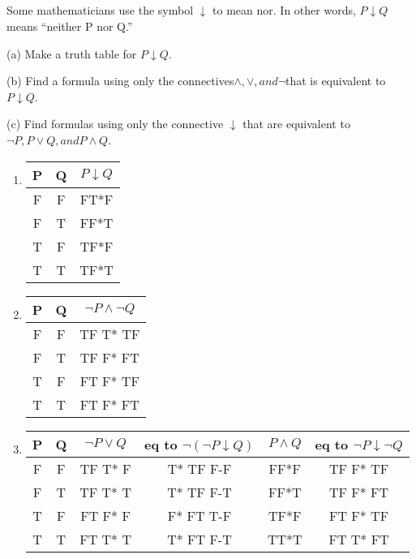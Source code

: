 \documentclass{article}
\begin{document}
\subsection{}
Some mathematicians use the symbol $\downarrow$ to mean nor. In other words,
$P \downarrow Q$ means “neither P nor Q.”

(a) Make a truth table for $P \downarrow Q$.

(b) Find a formula using only the connectives$ \land, \lor, and \neg $that is
equivalent to $P \downarrow Q$.

(c) Find formulas using only the connective $\downarrow$ that are equivalent to $\neg P, P
\lor Q, and P \land Q$.

\begin{enumerate}[label=(\alph*)]
  \item 
\begin{center}
 \begin{tabular}{||c c c ||} 
 \hline
 P & Q & $P \downarrow Q$ \\ [0.5ex] 
 \hline\hline
 F & F & FT*F\\ 
 \hline
 F & T & FF*T\\
 \hline
 T & F & TF*F\\
 \hline
 T & T & TF*T\\ [1ex] 
 \hline
\end{tabular}
\end{center}
\item
\begin{center}
 \begin{tabular}{||c c c ||} 
 \hline
 P & Q & $\neg P \land \neg Q$ \\ [0.5ex] 
 \hline\hline
 F & F & TF T* TF\\ 
 \hline
 F & T & TF F* FT\\
 \hline
 T & F & FT F* TF\\
 \hline
 T & T & FT F* FT\\ [1ex] 
 \hline
\end{tabular}
\end{center}
\item 
\begin{center}
 \begin{tabular}{||c c c c c c||} 
 \hline
 P & Q & $\neg P \lor Q$ &eq to $\neg(\neg P\downarrow Q )$ & $P \land Q$ & eq to $\neg P \downarrow \neg Q$  \\ [0.5ex] 
 \hline\hline
 F & F & TF T* F & T* TF F-F & FF*F & TF F* TF\\ 
 \hline
 F & T & TF T* T & T* TF F-T & FF*T & TF F* FT\\
 \hline
 T & F & FT F* F & F* FT T-F & TF*F & FT F* TF\\
 \hline
 T & T & FT T* T & T* FT F-T & TT*T & FT T* FT\\ [1ex] 
 \hline
\end{tabular}
\end{center}
\end{enumerate}
\end{document}
